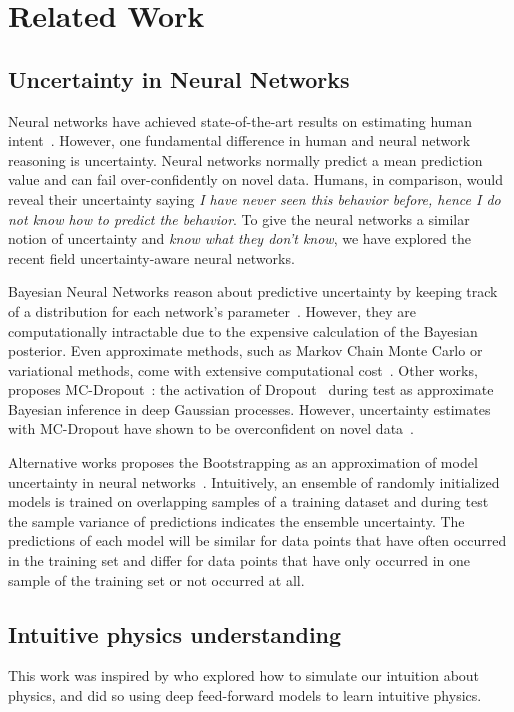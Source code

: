 
\section{Related Work} \label{sec:related_work}

\subsection{Uncertainty in Neural Networks}
Neural networks have achieved state-of-the-art results on estimating human intent~\cite{Vemula2017, Alahi2016}. However, one fundamental difference in human and neural network reasoning is uncertainty. Neural networks normally predict a mean prediction value and can fail over-confidently on novel data. Humans, in comparison, would reveal their uncertainty saying \textit{I have never seen this behavior before, hence I do not know how to predict the behavior}. To give the neural networks a similar notion of uncertainty and \textit{know what they don't know}, we have explored the recent field uncertainty-aware neural networks. 

Bayesian Neural Networks reason about predictive uncertainty by keeping track of a distribution for each network's parameter~\cite{MacKay1992, Neal1996}. However, they are computationally intractable due to the expensive calculation of the Bayesian posterior. Even approximate methods, such as Markov Chain Monte Carlo or variational methods, come with extensive computational cost~\cite{Louizos2016, Graves2011, Springenberg_2016}. Other works, proposes MC-Dropout~\cite{Gal2015}: the activation of Dropout~\cite{Dropout2014} during test as approximate Bayesian inference in deep Gaussian processes. However, uncertainty estimates with MC-Dropout have shown to be overconfident on novel data~\cite{Osband2016, Lakshmi2016}. 

Alternative works proposes the Bootstrapping as an approximation of model uncertainty in neural networks~\cite{Osband2016, Lakshmi2016}. Intuitively, an ensemble of randomly initialized models is trained on overlapping samples of a training dataset and during test the sample variance of predictions indicates the ensemble uncertainty. The predictions of each model will be similar for data points that have often occurred in the training set and differ for data points that have only occurred in one sample of the training set or not occurred at all. 

\subsection{Intuitive physics understanding}
This work was inspired by \cite{Lerer, Bramley2017} who explored how to simulate our intuition about physics, and did so using deep feed-forward models to learn intuitive physics.

